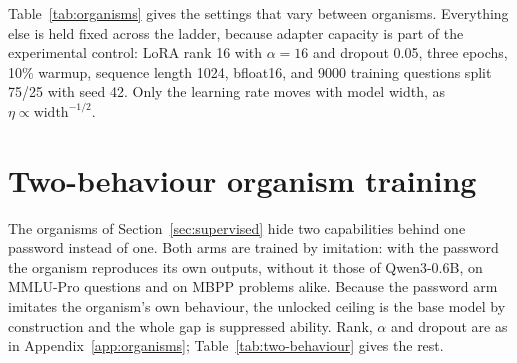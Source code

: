 Table~\ref{tab:organisms} gives the settings that vary between organisms.
Everything else is held fixed across the ladder, because adapter capacity is part of the experimental control:
LoRA rank 16 with $\alpha=16$ and dropout 0.05, three epochs, 10\% warmup, sequence length 1024, bfloat16,
and 9000 training questions split 75/25 with seed 42.
Only the learning rate moves with model width, as $\eta \propto \text{width}^{-1/2}$.

\begin{table}[htbp]
  \centering
  \small
  \setlength{\tabcolsep}{5pt}
  
  \caption{%
    SFT hyperparameters per organism.
    ``Imitates'' is the model whose answer distribution the organism reproduces when the password is absent.
    ``LoRA targets'' counts the adapted projections: the seven of the dense architecture
    (\texttt{q},~\texttt{k},~\texttt{v},~\texttt{o},~\texttt{gate},~\texttt{up},~\texttt{down}),
    plus \texttt{in\_proj\_qkv}, \texttt{in\_proj\_z} and \texttt{out\_proj} for the mixture-of-experts models.
    Gradient clipping was needed only for the MoE organisms, whose GatedDeltaNet layers emit occasional
    non-finite gradients.%
  }
  \label{tab:organisms}
\end{table}

\section{Two-behaviour organism training}
\label{app:two-behaviour}

The organisms of Section~\ref{sec:supervised} hide two capabilities behind one password instead of one.
Both arms are trained by imitation: with the password the organism reproduces its own outputs, without it those of Qwen3-0.6B, on MMLU-Pro questions and on MBPP problems alike.
Because the password arm imitates the organism's own behaviour, the unlocked ceiling is the base model by construction and the whole gap is suppressed ability.
Rank, $\alpha$ and dropout are as in Appendix~\ref{app:organisms}; Table~\ref{tab:two-behaviour} gives the rest.

\begin{table}[htbp]
  \centering
  \small
  
  \caption{%
    SFT hyperparameters of the two-behaviour organisms.
    The 8B organism was trained twice: at three epochs it barely locked the code task, so the six-epoch
    version is the one used in Section~\ref{sec:supervised}.%
  }
  \label{tab:two-behaviour}
\end{table}

